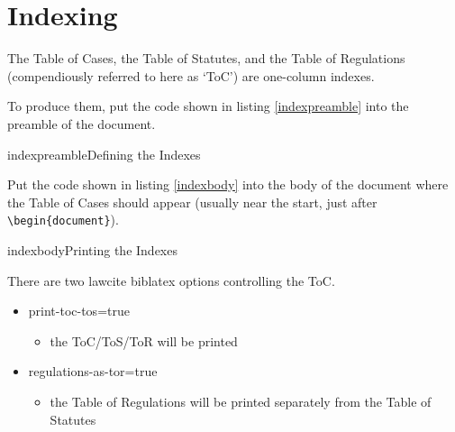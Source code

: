 \section{Indexing}
The Table of Cases, the Table of Statutes, and the Table of Regulations (compendiously referred to here as `ToC') are one-column indexes.

To produce them, put the code shown in listing \ref{indexpreamble} into the preamble of the document.

\begin{dov}{indexpreamble}{Defining the Indexes}
\usepackage{splitidx}
\makeindex
{}
\newcommand\pagerefindexnoteb{%
{\small\mdseries\itshape\hfill Page}}
\setindexpreamble[cases]{\pagerefindexnoteb}
\end{dov}


Put the code shown in listing \ref{indexbody} into the body of the document where the Table of Cases should appear (usually near the start, just after \texttt{\textbackslash begin\{document\}}).

\begin{dov}{indexbody}{Printing the Indexes}
\setindexhyperlinks
\let\xoldtwocolumn\twocolumn
\iftoggle{printlegtoc}{%
\let\oldtwocolumn\twocolumn
\renewcommand{\twocolumn}[1][]{#1}
\let\oldclearpage\clearpage
\renewcommand\clearpage{\relax}
\extendtheindex{}{\useindexpreamble}{}{}
\printindex[cases]
\printindex[legislation]
\iftoggle{printregulations}{%
\printindex[regulations]}{}
\renewcommand{\twocolumn}[1][]{\oldtwocolumn}
\renewcommand\clearpage{\oldclearpage}
}{}
\end{dov}

There are two lawcite biblatex options controlling the ToC.

\begin{itemize}
\item[] print-toc-tos=true 
	\begin{itemize}
	\item[] the ToC/ToS/ToR will be printed
	\end{itemize}
\item[] regulations-as-tor=true
	\begin{itemize}
	\item[] the Table of Regulations will be printed separately from the Table of Statutes
	\end{itemize}
\end{itemize}


